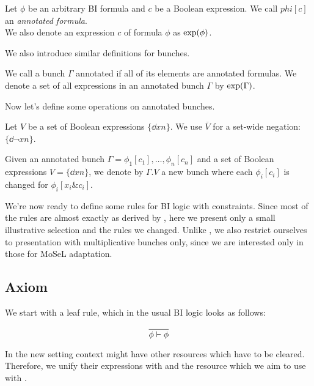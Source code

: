 \begin{definition}
  Let \(\phi\) be an arbitrary BI formula and \(c\) be a Boolean expression.
  We call \(phi[c]\) an \emph{annotated formula}.\\
  We also denote an expression \(c\) of formula \(\phi\) as \(\text{exp}(\phi)\).
\end{definition}

We also introduce similar definitions for bunches.

\begin{definition}
  We call a bunch \(\Gamma\) annotated if all of its elements are annotated formulas.
  We denote a set of all expressions in an annotated bunch \(\Gamma\) by \(\text{exp}(\Gamma)\).
\end{definition}

Now let's define some operations on annotated bunches.

\begin{definition}
  Let \(V\) be a set of Boolean expressions \(\{\dd {x} {n}\}\).
  We use \(\overline{V}\) for a set-wide negation: \(\{\dd {\neg {x}} {n}\}\).
\end{definition}

\begin{definition}
  Given an annotated bunch \(\Gamma = \phi_1[c_1],\ldots,\phi_n[c_n]\) and a set of Boolean expressions \(V = \{\dd {x} {n}\}\), we denote by \(\Gamma . V\) a new bunch where each \(\phi_i[c_i]\) is changed for \(\phi_i[x_i \& c_i]\).
\end{definition}

We're now ready to define some rules for BI logic with constraints.
Since most of the rules are almost exactly as derived by \citet{harlandResourceDistributionBooleanConstraints2003}, here we present only a small illustrative selection and the rules we changed.
Unlike \citeauthor{harlandResourceDistributionBooleanConstraints2003}, we also restrict ourselves to presentation with multiplicative bunches only, since we are interested only in those for MoSeL adaptation.

\subsection{Axiom}

We start with a leaf rule, which in the usual BI logic looks as follows:

\[\infer{\phi \vdash \phi}{}\]

In the new setting context might have other resources which have to be cleared.
Therefore, we unify their expressions with \false and the resource which we aim to use with \true.

